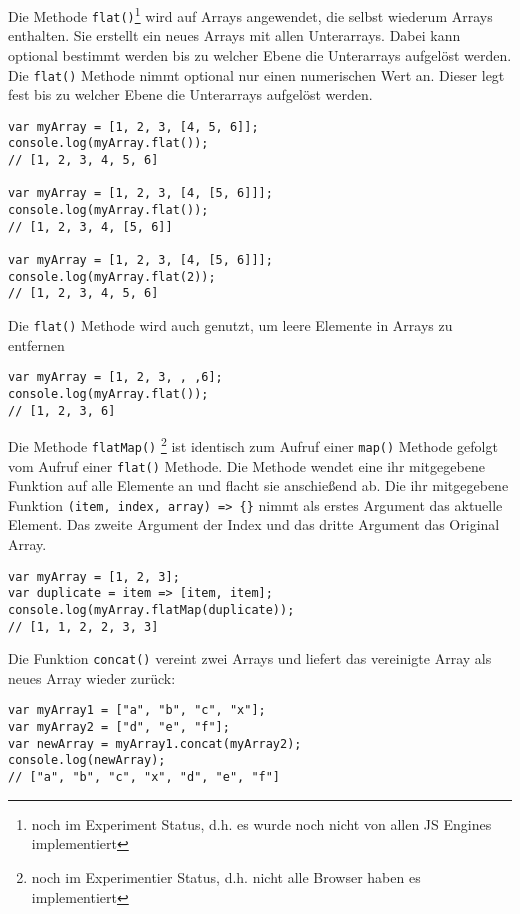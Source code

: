 \documentclass{book}
\begin{document}
Die Methode \lstinline|flat()|\footnote{noch im Experiment Status, d.h. es wurde noch nicht von allen JS Engines implementiert} wird auf Arrays angewendet, die selbst wiederum Arrays enthalten. Sie erstellt ein neues Arrays mit allen Unterarrays. Dabei kann optional bestimmt werden bis zu welcher Ebene die Unterarrays aufgelöst werden. Die \lstinline|flat()| Methode nimmt optional nur einen numerischen Wert an. Dieser legt fest bis zu welcher Ebene die Unterarrays aufgelöst werden.

\begin{lstlisting}[caption=Array Konstruktor]
var myArray = [1, 2, 3, [4, 5, 6]];
console.log(myArray.flat());
// [1, 2, 3, 4, 5, 6]

var myArray = [1, 2, 3, [4, [5, 6]]];
console.log(myArray.flat());
// [1, 2, 3, 4, [5, 6]]

var myArray = [1, 2, 3, [4, [5, 6]]];
console.log(myArray.flat(2));
// [1, 2, 3, 4, 5, 6]

\end{lstlisting}

Die \lstinline|flat()| Methode wird auch genutzt, um leere Elemente in Arrays zu entfernen
\begin{lstlisting}[caption=Array Konstruktor]
var myArray = [1, 2, 3, , ,6];
console.log(myArray.flat());
// [1, 2, 3, 6]
\end{lstlisting}

Die Methode \lstinline|flatMap()| \footnote{noch im Experimentier Status, d.h. nicht alle Browser haben es implementiert} ist identisch zum Aufruf einer \lstinline|map()| Methode gefolgt vom Aufruf einer \lstinline|flat()| Methode. Die Methode wendet eine ihr mitgegebene Funktion auf alle Elemente an und flacht sie anschießend ab. Die ihr mitgegebene Funktion \lstinline|(item, index, array) => {}| nimmt als erstes Argument das aktuelle Element. Das zweite Argument der Index und das dritte Argument das Original Array.

\begin{lstlisting}[caption=Array Konstruktor]
var myArray = [1, 2, 3];
var duplicate = item => [item, item];
console.log(myArray.flatMap(duplicate));
// [1, 1, 2, 2, 3, 3]
\end{lstlisting}

Die Funktion \lstinline|concat()| vereint zwei Arrays und liefert das vereinigte Array als neues Array wieder zurück:
\begin{lstlisting}[caption=Array Konstruktor]
var myArray1 = ["a", "b", "c", "x"];
var myArray2 = ["d", "e", "f"];
var newArray = myArray1.concat(myArray2);
console.log(newArray);
// ["a", "b", "c", "x", "d", "e", "f"]
\end{lstlisting}
\end{document}
